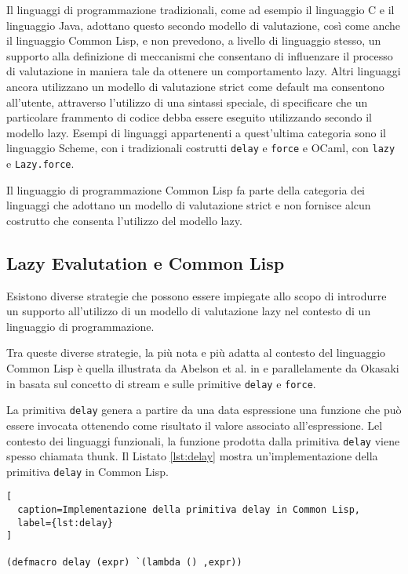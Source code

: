 Il linguaggi di programmazione tradizionali, come ad esempio il linguaggio C e il linguaggio Java, adottano questo secondo modello di valutazione, così come anche il linguaggio Common Lisp, e non prevedono, a livello di linguaggio stesso, un supporto alla definizione di meccanismi che consentano di influenzare il processo di valutazione in maniera tale da ottenere un comportamento lazy. Altri linguaggi ancora utilizzano un modello di valutazione strict come default ma consentono all'utente, attraverso l'utilizzo di una sintassi speciale, di specificare che un particolare frammento di codice debba essere eseguito utilizzando secondo il modello lazy. Esempi di linguaggi appartenenti a quest'ultima categoria sono il linguaggio Scheme, con i tradizionali costrutti \texttt{delay} e \texttt{force} e OCaml, con \texttt{lazy} e \texttt{Lazy.force}.

Il linguaggio di programmazione Common Lisp fa parte della categoria dei linguaggi che adottano un modello di valutazione strict e non fornisce alcun costrutto che consenta l'utilizzo del modello lazy.

\subsection{Lazy Evalutation e Common Lisp}

Esistono diverse strategie che possono essere impiegate allo scopo di introdurre un supporto all'utilizzo di un modello di valutazione lazy nel contesto di un linguaggio di programmazione.

Tra queste diverse strategie, la più nota e più adatta al contesto del linguaggio Common Lisp è quella illustrata da Abelson et al. in \cite{sicp} e parallelamente da Okasaki in \cite{okasaki} basata sul concetto di stream e sulle primitive \texttt{delay} e \texttt{force}.

La primitiva \texttt{delay} genera a partire da una data espressione una funzione che può essere invocata ottenendo come risultato il valore associato all'espressione. Lel contesto dei linguaggi funzionali, la funzione prodotta dalla primitiva \texttt{delay} viene spesso chiamata thunk. Il Listato \ref{lst:delay} mostra un'implementazione della primitiva \texttt{delay} in Common Lisp.

\begin{lstlisting}[
  caption=Implementazione della primitiva delay in Common Lisp,
  label={lst:delay}
]

(defmacro delay (expr) `(lambda () ,expr))

\end{lstlisting}

